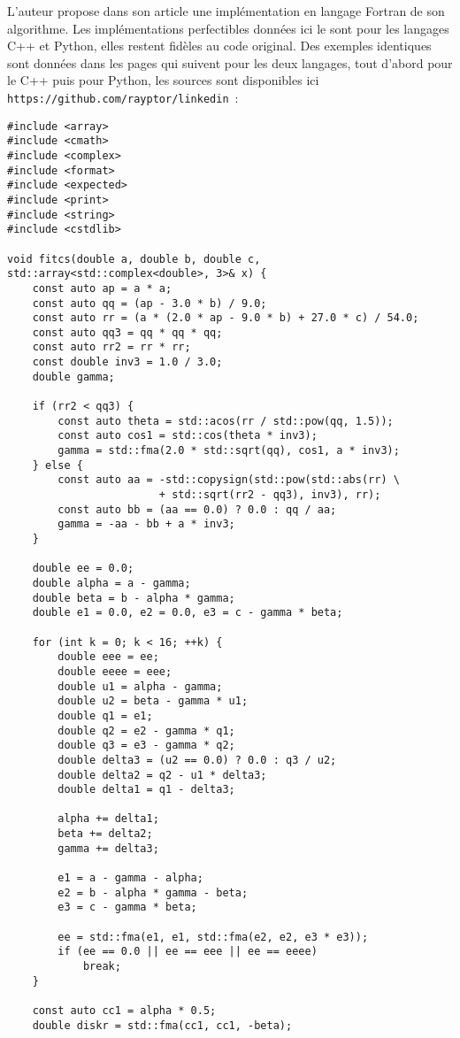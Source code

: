 \documentclass[11pt]{amsart}
\begin{document}
L'auteur propose dans son article une impl\'ementation en langage Fortran de son algorithme. Les impl\'ementations perfectibles donn\'ees ici le sont pour
les langages C++ et Python, elles restent fid\`eles au code original. Des exemples identiques sont donn\'ees dans les pages qui suivent pour les deux langages,
tout d'abord pour le C++ puis pour Python, les sources sont disponibles ici \texttt{https://github.com/rayptor/linkedin}~:
\begin{lstlisting}
#include <array>
#include <cmath>
#include <complex>
#include <format>
#include <expected>
#include <print>
#include <string>
#include <cstdlib>

void fitcs(double a, double b, double c, std::array<std::complex<double>, 3>& x) {
    const auto ap = a * a;
    const auto qq = (ap - 3.0 * b) / 9.0;
    const auto rr = (a * (2.0 * ap - 9.0 * b) + 27.0 * c) / 54.0;
    const auto qq3 = qq * qq * qq;
    const auto rr2 = rr * rr;
    const double inv3 = 1.0 / 3.0;
    double gamma;

    if (rr2 < qq3) {
        const auto theta = std::acos(rr / std::pow(qq, 1.5));
        const auto cos1 = std::cos(theta * inv3);
        gamma = std::fma(2.0 * std::sqrt(qq), cos1, a * inv3);
    } else {
        const auto aa = -std::copysign(std::pow(std::abs(rr) \
                        + std::sqrt(rr2 - qq3), inv3), rr);
        const auto bb = (aa == 0.0) ? 0.0 : qq / aa;
        gamma = -aa - bb + a * inv3;
    }

    double ee = 0.0;
    double alpha = a - gamma;
    double beta = b - alpha * gamma;
    double e1 = 0.0, e2 = 0.0, e3 = c - gamma * beta;

    for (int k = 0; k < 16; ++k) {
        double eee = ee;
        double eeee = eee;
        double u1 = alpha - gamma;
        double u2 = beta - gamma * u1;
        double q1 = e1;
        double q2 = e2 - gamma * q1;
        double q3 = e3 - gamma * q2;
        double delta3 = (u2 == 0.0) ? 0.0 : q3 / u2;
        double delta2 = q2 - u1 * delta3;
        double delta1 = q1 - delta3;

        alpha += delta1;
        beta += delta2;
        gamma += delta3;

        e1 = a - gamma - alpha;
        e2 = b - alpha * gamma - beta;
        e3 = c - gamma * beta;

        ee = std::fma(e1, e1, std::fma(e2, e2, e3 * e3));
        if (ee == 0.0 || ee == eee || ee == eeee)
            break;
    }

    const auto cc1 = alpha * 0.5;
    double diskr = std::fma(cc1, cc1, -beta);


\end{lstlisting}
\end{document}
